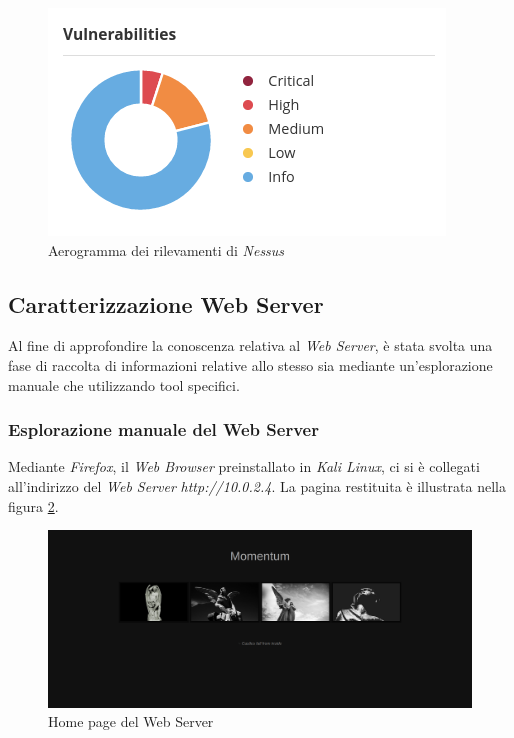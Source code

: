 \begin{figure}[h]
    \centering
    \includegraphics[scale=0.8]{capitoli/images/nessus-chart.png}
    \caption{Aerogramma dei rilevamenti di \emph{Nessus}}
    \label{fig:nessus-chart}
\end{figure}
\subsection{Caratterizzazione Web Server}
Al fine di approfondire la conoscenza relativa al \emph{Web Server}, è stata svolta una fase di raccolta di informazioni relative allo stesso sia mediante un'esplorazione manuale che utilizzando tool specifici.
\subsubsection{Esplorazione manuale del Web Server}
Mediante \emph{Firefox}, il \emph{Web Browser} preinstallato in \emph{Kali Linux}, ci si è collegati all'indirizzo del \emph{Web Server} \emph{http://10.0.2.4}. La pagina restituita è illustrata nella figura \ref{fig:index}.
\begin{figure}[h]
    \centering
    \includegraphics[scale=0.3]{capitoli/images/index.png}
    \caption{Home page del Web Server}
    \label{fig:index}
\end{figure}

